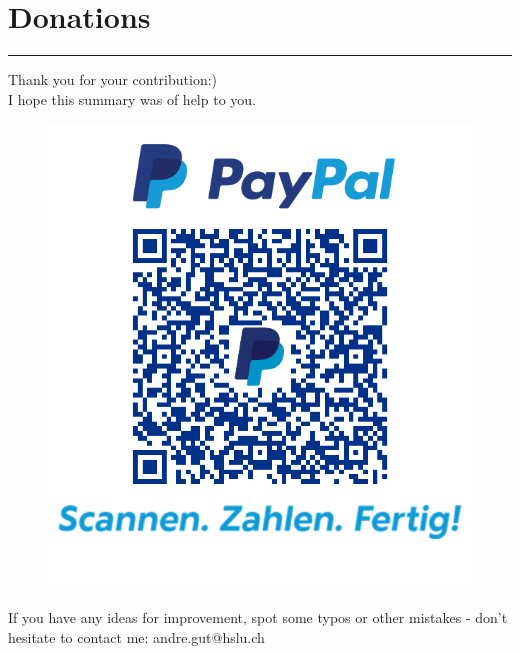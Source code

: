 \section{Donations}
\noindent\rule[\linienAbstand]{\linewidth}{\linienDickeDick}
Thank you for your contribution:)\\
I hope this summary was of help to you.
\begin{figure}[H]
  \centering
  \includegraphics[width=0.7\linewidth]{Pics/qrcode.png}
\end{figure}
If you have any ideas for improvement, spot some typos or other mistakes - don't hesitate to contact me: andre.gut@hslu.ch
